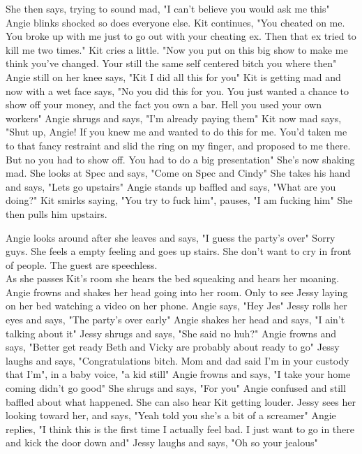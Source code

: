 \documentclass{article}[12px]
\begin{document}
    She then says, trying to sound mad, "I can't believe you would ask me this" Angie blinks shocked so does everyone else. Kit continues, "You cheated on me. You broke up with me just to go out with your cheating ex. Then that ex tried to kill me two times." Kit cries a little. "Now you put on this big show to make me think you've changed. Your still the same self centered bitch you where then" Angie still on her knee says, "Kit I did all this for you" Kit is getting mad and now with a wet face says, "No you did this for you. You just wanted a chance to show off your money, and the fact you own a bar. Hell  you used your own workers" Angie shrugs and says, "I'm already paying them" Kit now mad says, "Shut up, Angie! If you knew me and wanted to do this for me. You'd taken me to that fancy restraint and slid the ring on my finger, and proposed to me there. But no you had to show off. You had to do a big presentation" She's now shaking mad. She looks at Spec and says, "Come on Spec and Cindy" She takes his hand and says, "Lets go upstairs" Angie stands up baffled and says, "What are you doing?" Kit smirks saying, "You try to fuck him", pauses, "I am fucking him" She then pulls him upstairs.

    Angie looks around after she leaves and says, "I guess the party's over" Sorry guys. She feels a empty feeling and goes up stairs. She don't want to cry in front of people. The guest are speechless. \\

    As she passes Kit's room she hears the bed squeaking and hears her moaning. Angie frowns and shakes her head going into her room. Only to see Jessy laying on her bed watching a video on her phone. Angie says, "Hey Jes" Jessy rolls her eyes and says, "The party's over early" Angie shakes her head and says, "I ain't talking about it" Jessy shrugs and says, "She said no huh?" Angie frowns and says, "Better get ready Beth and Vicky are probably about ready to go" Jessy laughs and says, "Congratulations bitch. Mom and dad said I'm in your custody that I'm", in a baby voice, "a kid still" Angie frowns and says, "I take your home coming didn't go good" She shrugs and says, "For you" Angie confused and still baffled about what happened. She can also hear Kit getting louder. Jessy sees her looking toward her, and says, "Yeah told you she's a bit of a screamer" Angie replies, "I think this is the first time I actually feel bad. I just want to go in there and kick the door down and" Jessy laughs and says, "Oh so your jealous"
\end{document}

